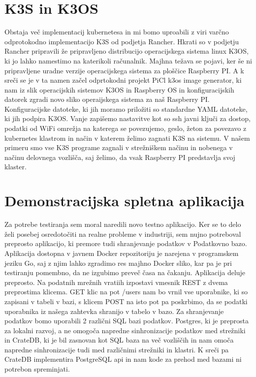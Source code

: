 \documentclass[a4paper, 12pt]{book}
\begin{document}
\section{K3S in K3OS}
Obstaja več implementacij kubernetesa in mi bomo uproabili z viri varčno odprotokodno implementacijo K3S od podjetja Rancher. Hkrati so v podjetju Rancher pripravili že pripravljeno distribucijo operacijskega sistema linux K3OS, ki jo lahko namestimo na katerikoli računalnik. 
Majhna težava se pojavi, ker še ni pripravljene uradne verzije operacijskega sistema za ploščice Raspberry PI.
A k sreči se je v ta namen začel odprtokodni projekt PiCl k3os image generator, ki nam iz slik operacijskih sistemov K3OS in Raspberry OS in konfiguracijskih datorek zgradi novo sliko operaijskega sistema za naš Raspberry PI.
Konfiguracijske datoteke, ki jih moramo priložiti so standardne YAML datoteke, ki jih podpira K3OS.
Vanje zapišemo nastavitve kot so ssh javni ključi za dostop, podatki od WiFi omrežja na katerega se povezujemo, geslo, žeton za povezavo z kubernetes klastrom in način v katerem želimo zagnati K3S na sistemu.
V našem primeru smo vse K3S programe zagnali v strežniškem načinu in nobenega v načinu delovnega vozlišča, saj želimo, da vsak Raspberry PI predstavlja svoj klaster.
\section{Demonstracijska spletna aplikacija}
Za potrebe testiranja sem moral naredili novo testno aplikacijo.
Ker se to delo želi posebej osredotočiti na realne probleme v industriji, sem nujno potreboval preprosto aplikacijo, ki premore tudi shranjevanje podatkov v Podatkovno bazo.
Aplikacija dostopna v javnem Docker repozitoriju je narejena v programskem jeziku Go, saj z njim lahko zgradimo res majhno Docker sliko, kar pa je pri testiranju pomembno, da ne izgubimo preveč časa na čakanju.
Aplikacija deluje preprosto.
Na podatnih mrežnih vratiih izpostavi vmesnik REST z dvema preprostima klicema.
GET klic na pot /users nam bo vrnil vse uporabnike, ki so zapisani v tabeli v bazi, s klicem POST na isto pot pa poskrbimo, da se podatki uporabnika iz našega zahtevka shranijo v tabelo v bazo.
Za shranjevanje podatkov bomo uporabili 2 različni SQL bazi podatkov.
Postgres, ki je preprosta za lokalni razvoj, a ne omogoča napredne sinhronizacije podatkov med strežniki in CrateDB, ki je bil zasnovan kot SQL baza na več vozliščih in nam omoča napredne sinhronizacije tudi med različnimi strežniki in klastri.
K sreči pa CrateDB implementira PostgreSQL api in nam kode za prehod med bazami ni potrebon spreminjati.
\end{document}
